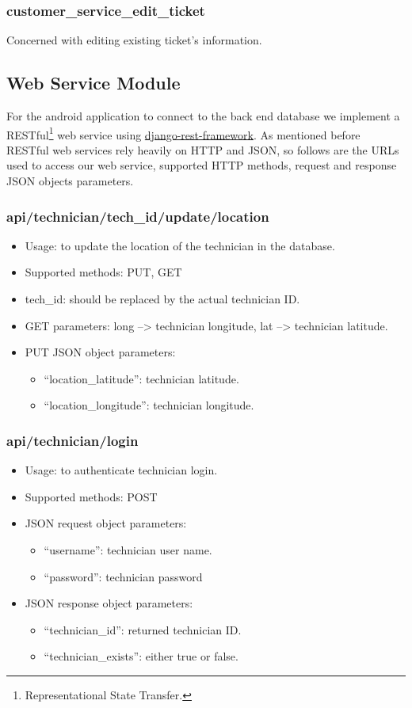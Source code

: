 	\subsubsection{customer\_service\_edit\_ticket}
		Concerned with editing existing ticket's information.
		
\subsection{Web Service Module}
	For the android application to connect to the back end database we implement a RESTful\footnote{Representational State Transfer.} web service using \href{http://www.django-rest-framework.org/}{django-rest-framework}. As mentioned before RESTful web services rely heavily on HTTP and JSON, so follows are the URLs used to access our web service, supported HTTP methods, request and response JSON objects parameters.
	
	\subsubsection{api/technician/tech\_id/update/location}
		\begin{itemize}
			\item Usage: to update the location of the technician in the database.
			\item Supported methods: PUT, GET
			\item tech\_id: should be replaced by the actual technician ID.
			\item GET parameters: long --> technician longitude, lat --> technician latitude.
			\item PUT JSON object parameters: \begin{itemize}
				\item ``location\_latitude'': technician latitude.
				\item ``location\_longitude'': technician longitude.
			\end{itemize}
		\end{itemize}
	\subsubsection{api/technician/login}
		\begin{itemize}
			\item Usage: to authenticate technician login.
			\item Supported methods: POST
			\item JSON request object parameters: \begin{itemize}
				\item ``username'': technician user name.
				\item ``password'': technician password
			\end{itemize}
			\item JSON response object parameters: \begin{itemize}
				\item ``technician\_id'': returned technician ID.
				\item  ``technician\_exists'': either true or false.
			\end{itemize}
		\end{itemize}
